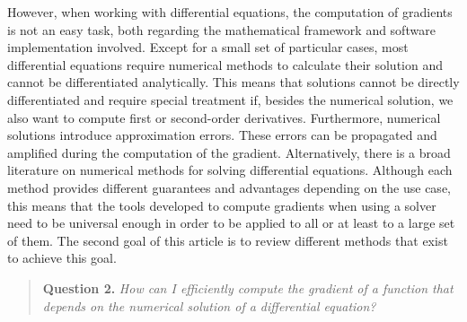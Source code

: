 However, when working with differential equations, the computation of gradients is not an easy task, both regarding the mathematical framework and software implementation involved. 
Except for a small set of particular cases, most differential equations require numerical methods to calculate their solution and cannot be differentiated analytically. 
This means that solutions cannot be directly differentiated and require special treatment if, besides the numerical solution, we also want to compute first or second-order derivatives. 
Furthermore, numerical solutions introduce approximation errors. 
These errors can be propagated and amplified during the computation of the gradient. 
Alternatively, there is a broad literature on numerical methods for solving differential equations. 
Although each method provides different guarantees and advantages depending on the use case, this means that the tools developed to compute gradients when using a solver need to be universal enough in order to be applied to all or 
at least to a large set of them. 
The second goal of this article is to review different methods that exist to achieve this goal.
\begin{quote}
    \textbf{Question 2. }
    \textit{How can I efficiently compute the gradient of a function that depends on the numerical solution of a differential equation?}
\end{quote}

